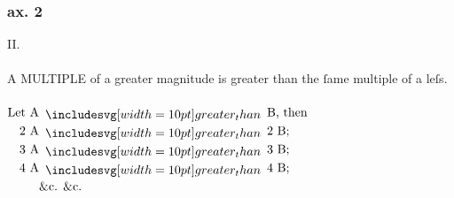 \begin{center}
\begin{minipage}{0.80\textwidth}
        \hfill

        \hfill

        \subsubsection{ax. 2}
        II.\label{book5ax2}\\
        \hfill\\
        A \textsc{MULTIPLE} of a greater magnitude is greater than the ſame multiple of a leſs.\\
        \hfill\\
        $\begin{aligned}
                \text{Let A} & \bgt \text{B, then} \\
                \text{2 A}   & \bgt \text{2 B;}    \\
                \text{3 A}   & \bgt \text{3 B;}    \\
                \text{4 A}   & \bgt \text{4 B;}    \\
                             & \text{\&c. \&c.}
            \end{aligned}$
    \end{minipage}%
\end{center}

\hfill

